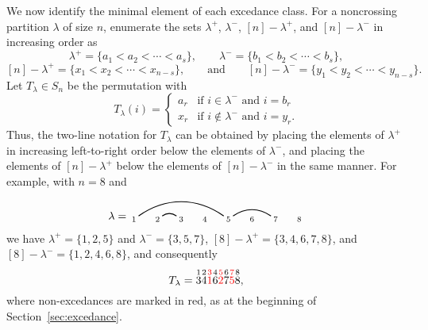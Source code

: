 \documentclass[submission]{FPSAC2024}
\theoremstyle{definition}
\theoremstyle{remark}
\numberwithin{equation}{section}
\renewcommand{\setminus}{-}
\begin{document}
We now identify the minimal element of each excedance class.  For a noncrossing partition $\lambda$ of size $n$, enumerate the sets $\lambda^{+}$, $\lambda^{-}$, $[n] \setminus \lambda^{+}$, and  $[n] \setminus \lambda^{-}$ in increasing order as
\[
\lambda^{+} = \{a_{1} < a_{2} < \cdots < a_{s}\},
\qquad
\lambda^{-} = \{b_{1} < b_{2} < \cdots < b_{s}\},
\]
\[
[n] \setminus \lambda^{+} = \{x_{1} < x_{2} < \cdots < x_{n-s}\},
\qquad\text{and}\qquad
[n] \setminus \lambda^{-} = \{y_{1} < y_{2} < \cdots < y_{n-s}\}.
\]
Let $T_{\lambda} \in S_{n}$ be the permutation with
\[
T_{\lambda}(i) = \begin{cases} a_{r} & \text{if $i \in \lambda^{-}$ and $i = b_{r}$} \\ x_{r} & \text{if $i \notin \lambda^{-}$ and $i = y_{r}$.}  \end{cases}
\]
Thus, the two-line notation for $T_{\lambda}$ can be obtained by placing the elements of $\lambda^{+}$ in increasing left-to-right order below the elements of $\lambda^{-}$, and placing the elements of $[n] \setminus \lambda^{+}$ below the elements of $[n] \setminus \lambda^{-}$ in the same manner.  For example, with $n = 8$ and 
\[
\lambda = \begin{tikzpicture}[scale = 0.75, baseline = 0.75*-0.2]
\foreach \x in {1, ..., 8}{\draw[fill] (\x - 1, 0) node[inner sep = 2pt] (\x) {$\scriptstyle \x$};}
\foreach \i\j in {1/5, 2/3, 5/7}{\draw[thick] (\i) to[out = 35, in = 145] (\j);}
\end{tikzpicture}
\]
we have $\lambda^{+} = \{1, 2, 5\}$ and $\lambda^{-} = \{3, 5, 7\}$, $[8] \setminus \lambda^{+} = \{3, 4, 6, 7, 8\}$, and $[8] \setminus \lambda^{-} = \{1, 2, 4, 6, 8\}$, and consequently
\[
T_{\lambda} = \overset{1}{3} \overset{2}{4} {\color{red} \overset{3}{1}} \overset{4}{6} {\color{red} \overset{5}{2}} \overset{6}{7} {\color{red} \overset{7}{5}} \overset{8}{8},
\]
where non-excedances are marked in red, as at the beginning of Section~\ref{sec:excedance}.
\end{document}
